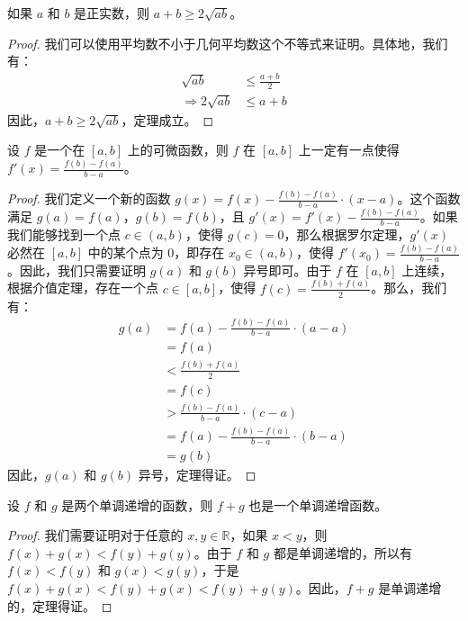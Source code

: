 \begin{cor}
如果 $a$ 和 $b$ 是正实数，则 $a+b \geq 2\sqrt{ab}$。
\end{cor}

\begin{proof}
我们可以使用平均数不小于几何平均数这个不等式来证明。具体地，我们有：
\begin{align*}
\sqrt{ab} &\leq \frac{a+b}{2} \\
\Rightarrow 2\sqrt{ab} &\leq a+b
\end{align*}
因此，$a+b \geq 2\sqrt{ab}$，定理成立。
\end{proof}

\begin{lem}
设 $f$ 是一个在 $[a,b]$ 上的可微函数，则 $f$ 在 $[a,b]$ 上一定有一点使得 $f'(x) = \frac{f(b)-f(a)}{b-a}$。
\end{lem}

\begin{proof}
我们定义一个新的函数 $g(x) = f(x) - \frac{f(b)-f(a)}{b-a} \cdot (x-a)$。这个函数满足 $g(a) = f(a)$，$g(b) = f(b)$，且 $g'(x) = f'(x) - \frac{f(b)-f(a)}{b-a}$。如果我们能够找到一个点 $c \in (a,b)$，使得 $g(c) = 0$，那么根据罗尔定理，$g'(x)$ 必然在 $[a,b]$ 中的某个点为 $0$，即存在 $x_0 \in (a,b)$，使得 $f'(x_0) = \frac{f(b)-f(a)}{b-a}$。因此，我们只需要证明 $g(a)$ 和 $g(b)$ 异号即可。由于 $f$ 在 $[a,b]$ 上连续，根据介值定理，存在一个点 $c \in [a,b]$，使得 $f(c) = \frac{f(b)+f(a)}{2}$。那么，我们有：
\begin{align*}
g(a) &= f(a) - \frac{f(b)-f(a)}{b-a} \cdot (a-a) \\
&= f(a) \\
&< \frac{f(b)+f(a)}{2} \\
&= f(c) \\
&> \frac{f(b)-f(a)}{b-a} \cdot (c-a) \\
&= f(a) - \frac{f(b)-f(a)}{b-a} \cdot (b-a) \\
&= g(b)
\end{align*}
因此，$g(a)$ 和 $g(b)$ 异号，定理得证。
\end{proof}

\begin{prop}
设 $f$ 和 $g$ 是两个单调递增的函数，则 $f+g$ 也是一个单调递增函数。
\end{prop}

\begin{proof}
我们需要证明对于任意的 $x,y \in \mathbb{R}$，如果 $x < y$，则 $f(x)+g(x) < f(y)+g(y)$。由于 $f$ 和 $g$ 都是单调递增的，所以有 $f(x) < f(y)$ 和 $g(x) < g(y)$，于是 $f(x)+g(x) < f(y)+g(x) < f(y)+g(y)$。因此，$f+g$ 是单调递增的，定理得证。
\end{proof}


